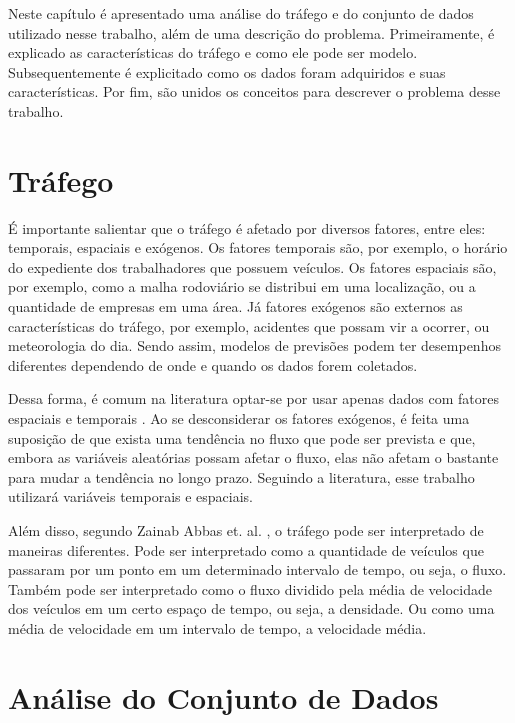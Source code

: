 Neste capítulo é apresentado uma análise do tráfego e do conjunto de dados utilizado nesse trabalho, além de uma descrição do problema. Primeiramente, é explicado as características do tráfego e como ele pode ser modelo. Subsequentemente é explicitado como os dados foram adquiridos e suas características. Por fim, são unidos os conceitos para descrever o problema desse trabalho.

\section{Tráfego}

É importante salientar que o tráfego é afetado por diversos fatores, entre eles: temporais, espaciais e exógenos. Os fatores temporais são, por exemplo, o horário do expediente dos trabalhadores que possuem veículos. Os fatores espaciais são, por exemplo, como a malha rodoviário se distribui em uma localização, ou a quantidade de empresas em uma área. Já fatores exógenos são externos as características do tráfego, por exemplo, acidentes que possam vir a ocorrer, ou meteorologia do dia. Sendo assim, modelos de previsões podem ter desempenhos diferentes dependendo de onde e quando os dados forem coletados.

Dessa forma, é comum na literatura optar-se por usar apenas dados com fatores espaciais e temporais \cite{lana_2018}. Ao se desconsiderar os fatores exógenos, é feita uma suposição de que exista uma tendência no fluxo que pode ser prevista e que, embora as variáveis aleatórias possam afetar o fluxo, elas não afetam o bastante para mudar a tendência no longo prazo. Seguindo a literatura, esse trabalho utilizará variáveis temporais e espaciais. 

Além disso, segundo Zainab Abbas et. al. \cite{Zainab_2018}, o tráfego pode ser interpretado de maneiras diferentes. Pode ser interpretado como a quantidade de veículos que passaram por um ponto em um determinado intervalo de tempo, ou seja, o fluxo. Também pode ser interpretado como o fluxo dividido pela média de velocidade dos veículos em um certo espaço de tempo, ou seja, a densidade. Ou como uma média de velocidade em um intervalo de tempo, a velocidade média.

\section{Análise do Conjunto de Dados}

